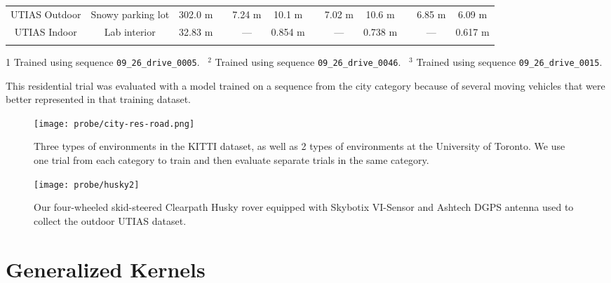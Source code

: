 \begin{table}
\begin{threeparttable}
\begin{tabular}{cccccccccccc}
                UTIAS Outdoor & Snowy parking lot & 302.0 m && 7.24 m & 10.1 m && 7.02 m & 10.6 m && 6.85 m & 6.09 m \\ 
                UTIAS Indoor & Lab interior & 32.83 m && --- & 0.854 m && --- & 0.738 m && --- & 0.617 m  \B \\    
        \hline
            \label{table:probe_kitti_data}
        \end{tabular}
        \begin{tablenotes}
            \item[1] Trained using sequence \texttt{09\_26\_drive\_0005}. ~$^2$ Trained using sequence  \texttt{09\_26\_drive\_0046}. ~$^3$ Trained using sequence  \texttt{09\_26\_drive\_0015}.  
            \item[\dag] This residential trial was evaluated with a model trained on a sequence from the city category because of several moving vehicles that were better represented in that training dataset.
        \end{tablenotes}
    \end{threeparttable}
\end{table}

\begin{figure}
    \centering
    \texttt{[image: probe/city-res-road.png]}
    \caption{Three types of environments in the KITTI dataset, as well as 2 types of environments at the University of Toronto.  We use one trial from each category to train and then evaluate separate trials in the same category.}
    \label{fig:probe_KITTI-Types}
\end{figure}

\begin{figure}
    \centering
    \texttt{[image: probe/husky2]}
    \caption{Our four-wheeled skid-steered Clearpath Husky rover equipped with Skybotix VI-Sensor and Ashtech DGPS antenna used to collect the outdoor UTIAS dataset.}
    \label{fig:probe_huskypic}
\end{figure}

\section{Generalized Kernels}

